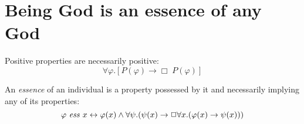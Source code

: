 \documentclass{article}
\newcommand{\imp}{\rightarrow}
\newcommand{\biimp}{\leftrightarrow}
\newcommand{\all}{\forall}
\newcommand{\nec}{\Box} %
\begin{document}
\section{Being God is an essence of any God}

\begin{axiom}
\label{A4}
Positive properties are necessarily positive:
$$
\all \varphi.[P(\varphi) \to \Box \; P(\varphi)]
$$
\end{axiom}

\begin{definition}
\label{D2}
An \emph{essence} of an individual is a property possessed by it and necessarily implying any of its properties: 
$$
\ess{\varphi}{x} \biimp \varphi(x) \wedge \all \psi. (\psi(x) \imp \nec \all x. (\varphi(x) \imp \psi(x)))
$$
\end{definition}
\end{document}
